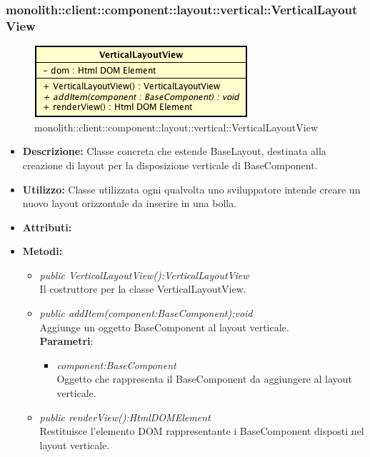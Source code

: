 \subsubsection{monolith::client::component::layout::vertical::VerticalLayoutView}

\label{monolith::client::component::layout::vertical::VerticalLayoutView}
\begin{figure}[H]
	\centering
	\includegraphics[scale=0.5]{Sezioni/SottosezioniST/img/VerticalLayoutView.png}
	\caption{monolith::client::component::layout::vertical::VerticalLayoutView}
\end{figure}

\begin{itemize}
\item \textbf{Descrizione:} Classe concreta che estende BaseLayout, destinata alla creazione di layout per la disposizione verticale di BaseComponent.
\item \textbf{Utilizzo:} Classe utilizzata ogni qualvolta uno sviluppatore intende creare un nuovo layout orizzontale da inserire in una bolla.
\item \textbf{Attributi:}
\item \textbf{Metodi:}
\begin{itemize}
\item\textit{public VerticalLayoutView():VerticalLayoutView}\\
Il costruttore per la classe VerticalLayoutView.
\item \textit{public addItem(component:BaseComponent):void}\\
Aggiunge un oggetto BaseComponent al layout verticale.
\\ \textbf{Parametri}: \begin{itemize}
\item \textit{component:BaseComponent}\\
Oggetto che rappresenta il BaseComponent da aggiungere al layout verticale.
\end{itemize}
\item \textit{public renderView():HtmlDOMElement}\\
Restituisce l'elemento DOM rappresentante i BaseComponent disposti nel layout verticale.
\end{itemize}
\end{itemize}

